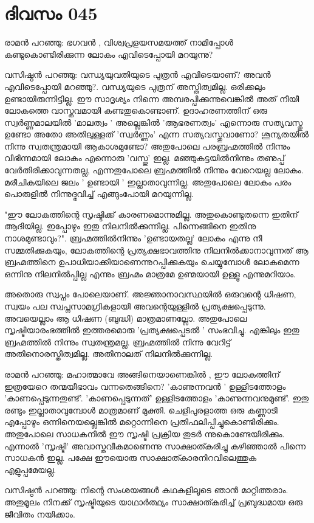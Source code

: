  
\section{ദിവസം 045}


രാമന്‍ പറഞ്ഞു: ഭഗവന്‍ , വിശ്വപ്രളയസമയത്ത്‌ നാമിപ്പോള്‍ കണ്ടുകൊണ്ടിരിക്കുന്ന ലോകം എവിടെപ്പോയി മറയുന്നു?

വസിഷ്ഠന്‍ പറഞ്ഞു: വന്ധ്യയുവതിയുടെ പുത്രന്‍ എവിടെയാണ്‌? അവന്‍ എവിടെപ്പോയി മറഞ്ഞു?. വന്ധ്യയുടെ പുത്രന്‌ അസ്തിത്വമില്ല. ഒരിക്കലും ഉണ്ടായിരുന്നിട്ടില്ല. ഈ സാദൃശ്യം നിന്നെ അമ്പരപ്പിക്കുന്നുവെങ്കില്‍ അത്‌ നീയീ ലോകത്തെ വാസ്തവമായി കണ്ടതുകൊണ്ടാണ്‌. ഉദാഹരണത്തിന്‌ ഒരു സ്വര്‍ണ്ണമാലയില്‍ 'മാലത്വം '  അല്ലെങ്കിൽ 'ആഭരണത്വം' എന്നൊരു സത്യവസ്തു ഉണ്ടോ അതോ അതിലുള്ളത്‌ 'സ്വര്‍ണ്ണം' എന്ന സത്യവസ്തുവാണോ? ശൂന്യതയില്‍ നിന്നു സ്വതന്ത്രമായി ആകാശമുണ്ടോ? അതുപോലെ പരബ്രഹ്മത്തില്‍ നിന്നും വിഭിന്നമായി ലോകം എന്നൊരു 'വസ്തു' ഇല്ല. മഞ്ഞുകട്ടയില്‍നിന്നും തണുപ്പ്‌ വേര്‍തിരിക്കാവുന്നതല്ല, എന്നതുപോലെ ബ്രഹ്മത്തില്‍ നിന്നും വേറെയല്ല ലോകം. മരീചികയിലെ ജലം  ' ഉണ്ടായി '  ഇല്ലാതാവുന്നില്ല. അതുപോലെ ലോകം പരം പൊരുളില്‍ നിന്നുദ്ഭവിച്ച്‌ എങ്ങുംപോയി മറയുന്നില്ല. 

"ഈ ലോകത്തിന്റെ സൃഷ്ടിക്ക്‌ കാരണമൊന്നുമില്ല. അതുകൊണ്ടുതന്നെ ഇതിന്‌ ആദിയില്ല. ഇപ്പോഴും ഇതു നിലനില്‍ക്കുന്നില്ല. പിന്നെങ്ങിനെ ഇതിനു നാശമുണ്ടാവും?". ബ്രഹ്മത്തില്‍നിന്നും 'ഉണ്ടായതല്ല' ലോകം എന്നു നീ സമ്മതിക്കുകയും, ലോകത്തിന്റെ പ്രത്യക്ഷഭാവത്തിനു നിലനില്‍ക്കാനാവുന്നത്‌ ആ ബ്രഹ്മത്തിനെ ഉപാധിയാക്കിയാണെന്നുറപ്പിക്കുകയും ചെയ്യുമ്പോള്‍ ലോകമെന്ന ഒന്നിനു നിലനില്‍പ്പില്ല എന്നും ബ്രഹ്മം മാത്രമേ ഉണ്മയായി ഉള്ളൂ എന്നുമറിയാം.

അതൊരു സ്വപ്നം പോലെയാണ്‌. അജ്ഞാനാവസ്ഥയില്‍ ഒരുവന്റെ  ധിഷണ, സ്വയം പല സ്വപ്നസാമഗ്രികളായി അവന്റെയുള്ളില്‍ പ്രത്യക്ഷപ്പെടുന്നു. അവയെല്ലാം ആ ധിഷണ (ബുദ്ധി) മാത്രമാണല്ലോ. അതുപോലെ സൃഷ്ടിയാരംഭത്തില്‍ ഇത്തരമൊരു 'പ്രത്യക്ഷപ്പെടല്‍ ' സംഭവിച്ചു. എങ്കിലും ഇതു ബ്രഹ്മത്തില്‍ നിന്നും സ്വതന്ത്രമല്ല. ബ്രഹ്മത്തില്‍ നിന്നു വേറിട്ട്‌ അതിനൊരസ്തിത്വമില്ല. അതിനാലത്‌ നിലനില്‍ക്കുന്നില്ല.

രാമന്‍ പറഞ്ഞു: മഹാത്മാവേ അങ്ങിനെയാണെങ്കില്‍ , ഈ ലോകത്തിന്‌ ഇത്രയേറെ തന്മയീഭാവം വന്നതെങ്ങിനെ? 'കാണുന്നവന്‍ ' ഉള്ളിടത്തോളം 'കാണപ്പെടുന്നതുണ്ട്‌'. 'കാണപ്പെടുന്നത്‌' ഉള്ളിടത്തോളം 'കാണുന്നവനുമുണ്ട്‌'. ഇതു രണ്ടും ഇല്ലാതാവുമ്പോള്‍ മാത്രമാണ്‌ മുക്തി. ചെളിപുരളാത്ത ഒരു കണ്ണാടി എപ്പോഴും ഒന്നിനെയല്ലെങ്കില്‍ മറ്റൊന്നിനെ പ്രതിഫലിപ്പിച്ചുകൊണ്ടിരിക്കും. അതുപോലെ സാധകനില്‍ ഈ സൃഷ്ടി പ്രക്രിയ തുടര്‍ ന്നുകൊണ്ടേയിരിക്കും. എന്നാല്‍ 'സൃഷ്ടി' അവാസ്തവീകമാണെന്നു സാക്ഷാത്കരിച്ചു കഴിഞ്ഞാല്‍ പിന്നെ സാധകന്‍ ഇല്ല. പക്ഷേ ഈയൊരു സാക്ഷാത്കാരനിറവിലെത്തുക എളുപ്പമേയല്ല.

വസിഷ്ഠന്‍ പറഞ്ഞു: നിന്റെ സംശയങ്ങള്‍ കഥകളിലൂടെ ഞാന്‍ മാറ്റിത്തരാം. അതുമൂലം നിനക്ക്‌ സൃഷ്ടിയുടെ യാഥാര്‍ത്ഥ്യം സാക്ഷാത്കരിച്ച്‌ പ്രബുദ്ധമായ ഒരു ജീവിതം നയിക്കാം. 

